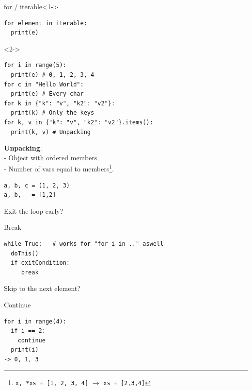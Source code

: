 \documentclass{beamer}
\begin{document}
\begin{frame}[fragile]
	\begin{block}{for / iterable}<1->
		\begin{verbatim}
for element in iterable:
  print(e)
		\end{verbatim}
	\end{block}
\begin{example}<2->
		\begin{verbatim}
for i in range(5):
  print(e) # 0, 1, 2, 3, 4
for c in "Hello World":
  print(e) # Every char
for k in {"k": "v", "k2": "v2"}:
  print(k) # Only the keys
for k, v in {"k": "v", "k2": "v2"}.items():
  print(k, v) # Unpacking
\end{verbatim}
\end{example}
\end{frame}

\begin{frame}[fragile]
\textbf{Unpacking}:\\
- Object with ordered members\\
- Number of vars equal to members\footnote{\texttt{x, *xs  = [1, 2, 3, 4]}  $\rightarrow$ \texttt{xs = [2,3,4]}}.
\begin{example}
	\begin{verbatim}
a, b, c = (1, 2, 3)
a, b,   = [1,2]
	\end{verbatim}
\end{example}
\end{frame}

\begin{frame}[fragile]
	Exit the loop early?
	\begin{block}{Break}
	\begin{verbatim}
while True:   # works for "for i in .." aswell 
  doThis()
  if exitCondition:
     break
	\end{verbatim}
	\end{block}
	Skip to the next element?
	\begin{block}{Continue}
		\begin{verbatim}
for i in range(4):
  if i == 2:
    continue
  print(i)
-> 0, 1, 3
		\end{verbatim}
	\end{block}
\end{frame}
\end{document}
